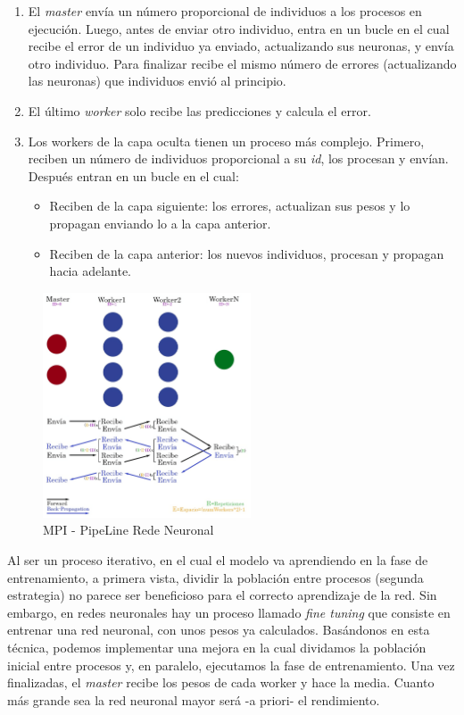 	
	\begin{enumerate}
		\item El \textit{master} envía un número proporcional de individuos a los procesos en ejecución. Luego, antes de enviar otro individuo, entra en un bucle en el cual recibe el error de un individuo ya enviado, actualizando sus neuronas, y envía otro individuo. Para finalizar recibe el mismo número de errores (actualizando las neuronas) que individuos envió al principio.
		\item El último \textit{worker} solo recibe las predicciones y calcula el error.
		\item Los workers de la capa oculta tienen un proceso más complejo. Primero, reciben un número de individuos proporcional a su \textit{id}, los procesan y envían. Después entran en un bucle en el cual:			
		\begin{itemize}
			\item Reciben de la capa siguiente: los errores, actualizan sus pesos y lo propagan enviando lo a la capa anterior.			
			\item Reciben de la capa anterior: los nuevos individuos, procesan y propagan hacia adelante.
		\end{itemize}		
		
	\end{enumerate}
	
	\begin{figure}[!h]
		\centering
		\includegraphics[width=0.55\textwidth]{images/chapter_3/redneu_mpi2}
		\caption{MPI - PipeLine Rede Neuronal}
		\label{fig:redneumpipipe}
	\end{figure}
	
	Al ser un proceso iterativo, en el cual el modelo va aprendiendo en la fase de entrenamiento, a primera vista, dividir la población entre procesos (segunda estrategia) no parece ser beneficioso para el correcto aprendizaje de la red. Sin embargo, en redes neuronales hay un proceso llamado \textit{fine tuning} \cite{malladi2023fine} que consiste en entrenar una red neuronal, con unos pesos ya calculados. Basándonos en esta técnica, podemos implementar una mejora en la cual dividamos la población inicial entre procesos y, en paralelo, ejecutamos la fase de entrenamiento. Una vez finalizadas, el \textit{master} recibe los pesos de cada worker y hace la media. Cuanto más grande sea la red neuronal mayor será -a priori- el rendimiento.
		
